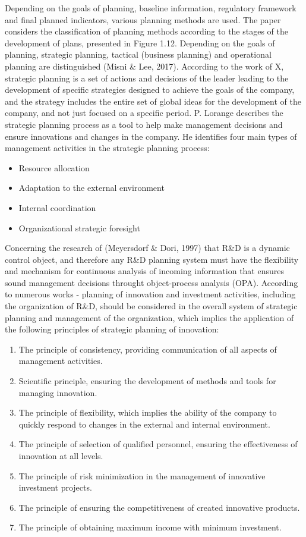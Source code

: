 \documentclass[12pt,twoside]{reedthesis}
\providecommand{\tightlist}{%
  \setlength{\itemsep}{0pt}\setlength{\parskip}{0pt}}
\begin{document}
Depending on the goals of planning, baseline information, regulatory framework and final planned indicators, various planning methods are used. The paper considers the classification of planning methods according to the stages of the development of plans, presented in Figure 1.12. Depending on the goals of planning, strategic planning, tactical (business planning) and operational planning are distinguished (Misni \& Lee, 2017). According to the work of X, strategic planning is a set of actions and decisions of the leader leading to the development of specific strategies designed to achieve the goals of the company, and the strategy includes the entire set of global ideas for the development of the company, and not just focused on a specific period. P. Lorange describes the strategic planning process as a tool to help make management decisions and ensure innovations and changes in the company. He identifies four main types of management activities in the strategic planning process:
\begin{itemize}
\tightlist
\item
  Resource allocation
\item
  Adaptation to the external environment
\item
  Internal coordination
\item
  Organizational strategic foresight
\end{itemize}
Concerning the research of (Meyersdorf \& Dori, 1997) that R\&D is a dynamic control object, and therefore any R\&D planning system must have the flexibility and mechanism for continuous analysis of incoming information that ensures sound management decisions throught object-process analysis (OPA). According to numerous works - planning of innovation and investment activities, including the organization of R\&D, should be considered in the overall system of strategic planning and management of the organization, which implies the application of the following principles of strategic planning of innovation:
\begin{enumerate}
\def\labelenumi{\arabic{enumi}.}
\tightlist
\item
  The principle of consistency, providing communication of all aspects of management activities.
\item
  Scientific principle, ensuring the development of methods and tools for managing innovation.
\item
  The principle of flexibility, which implies the ability of the company to quickly respond to changes in the external and internal environment.
\item
  The principle of selection of qualified personnel, ensuring the effectiveness of innovation at all levels.
\item
  The principle of risk minimization in the management of innovative investment projects.
\item
  The principle of ensuring the competitiveness of created innovative products.
\item
  The principle of obtaining maximum income with minimum investment.
\end{enumerate}
\end{document}
